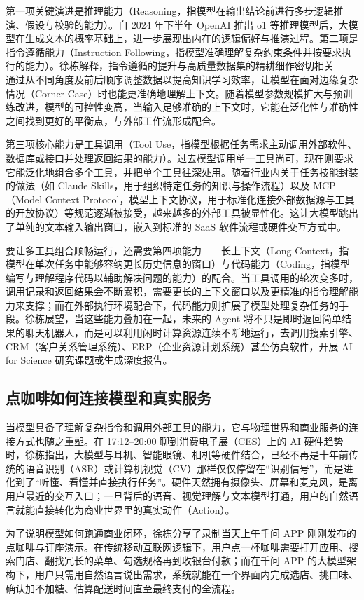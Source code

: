 \documentclass[UTF8,a4paper,11pt,fontset=fandol]{ctexart}
\begin{document}
第一项关键演进是推理能力（Reasoning，指模型在输出结论前进行多步逻辑推演、假设与校验的能力）。自 2024 年下半年 OpenAI 推出 o1 等推理模型后，大模型在生成文本的概率基础上，进一步展现出内在的逻辑偏好与推演过程。第二项是指令遵循能力（Instruction Following，指模型准确理解复杂约束条件并按要求执行的能力）。徐栋解释，指令遵循的提升与高质量数据集的精耕细作密切相关——通过从不同角度及前后顺序调整数据以提高知识学习效率，让模型在面对边缘复杂情况（Corner Case）时也能更准确地理解上下文。随着模型参数规模扩大与预训练改进，模型的可控性变高，当输入足够准确的上下文时，它能在泛化性与准确性之间找到更好的平衡点，与外部工作流形成配合。

第三项核心能力是工具调用（Tool Use，指模型根据任务需求主动调用外部软件、数据库或接口并处理返回结果的能力）。过去模型调用单一工具尚可，现在则要求它能泛化地组合多个工具，并把单个工具往深处用。随着行业内关于任务技能封装的做法（如 Claude Skills，用于组织特定任务的知识与操作流程）以及 MCP（Model Context Protocol，模型上下文协议，用于标准化连接外部数据源与工具的开放协议）等规范逐渐被接受，越来越多的外部工具被显性化。这让大模型跳出了单纯的文本输入输出窗口，嵌入到标准的 SaaS 软件流程或硬件交互方式中。

要让多工具组合顺畅运行，还需要第四项能力——长上下文（Long Context，指模型在单次任务中能够容纳更长历史信息的窗口）与代码能力（Coding，指模型编写与理解程序代码以辅助解决问题的能力）的配合。当工具调用的轮次变多时，调用记录和返回结果会不断累积，需要更长的上下文窗口以及更精准的指令理解能力来支撑；而在外部执行环境配合下，代码能力则扩展了模型处理复杂任务的手段。徐栋展望，当这些能力叠加在一起，未来的 Agent 将不只是即时返回简单结果的聊天机器人，而是可以利用闲时计算资源连续不断地运行，去调用搜索引擎、CRM（客户关系管理系统）、ERP（企业资源计划系统）甚至仿真软件，开展 AI for Science 研究课题或生成深度报告。

\subsection{点咖啡如何连接模型和真实服务}
当模型具备了理解复杂指令和调用外部工具的能力，它与物理世界和商业服务的连接方式也随之重塑。在 17:12–20:00 聊到消费电子展（CES）上的 AI 硬件趋势时，徐栋指出，大模型与耳机、智能眼镜、相机等硬件结合，已经不再是十年前传统的语音识别（ASR）或计算机视觉（CV）那样仅仅停留在“识别信号”，而是进化到了“听懂、看懂并直接执行任务”。硬件天然拥有摄像头、屏幕和麦克风，是离用户最近的交互入口；一旦背后的语音、视觉理解与文本模型打通，用户的自然语言就能直接转化为商业世界里的真实动作（Action）。

为了说明模型如何跑通商业闭环，徐栋分享了录制当天上午千问 APP 刚刚发布的点咖啡与订座演示。在传统移动互联网逻辑下，用户点一杯咖啡需要打开应用、搜索门店、翻找冗长的菜单、勾选规格再到收银台付款；而在千问 APP 的大模型架构下，用户只需用自然语言说出需求，系统就能在一个界面内完成选店、挑口味、确认加不加糖、估算配送时间直至最终支付的全流程。
\end{document}
